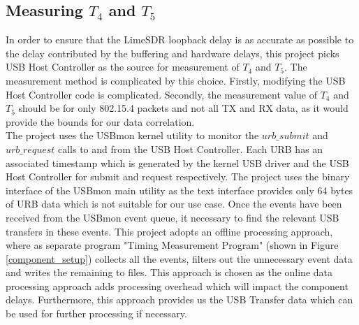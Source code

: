 \subsection{Measuring $T_4$ and $T_5$}
In order to ensure that the LimeSDR loopback delay is as accurate as possible to the delay contributed by the buffering and hardware delays, this project picks USB Host Controller as the source for measurement of $T_4$ and $T_5$.
The measurement method is complicated by this choice.
Firstly, modifying the USB Host Controller code is complicated.
Secondly, the measurement value of $T_4$ and $T_5$ should be for only 802.15.4 packets and not all TX and RX data, as it would provide the bounds for our data correlation.\\

The project uses the USBmon kernel utility to monitor the $urb\_submit$ and $urb\_request $ calls to and from the \ac{USB} Host Controller.
Each URB has an associated timestamp which is generated by the kernel \ac{USB} driver and the \ac{USB} Host Controller for submit and request respectively.
The project uses the binary interface of the USBmon main utility as the text interface provides only 64 bytes of URB data which is not suitable for our use case.
Once the events have been received from the USBmon event queue, it necessary to find the relevant USB transfers in these events.
This project adopts an offline processing approach, where as separate program "Timing Measurement Program" (shown in Figure \ref{component_setup}) collects all the events, filters out the unnecessary event data and writes the remaining to files.
This approach is chosen as the online data processing approach adds processing overhead which will impact the component delays.
Furthermore, this approach provides us the USB Transfer data which can be used for further processing if necessary.

